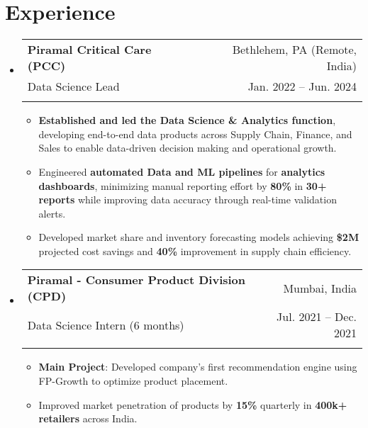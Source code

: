 \documentclass[letter paper,11pt]{article}
\makeatletter
\newcommand{\resumeItem}[1]{
\justifying
\vspace{-2.89pt}
  \item\small{
    {#1}
  }
}
\newcommand{\resumeSubheading}[5]{%
  \item
    \begin{tabular*}
    {1\textwidth}
    {l@{\extracolsep{\fill}}r}
      \textbf{#1} & \small#2 \\
      {\small#3} & {\small #4} \\
      {\small#5}
    \end{tabular*}%
  \vspace{-0.95cm}
}
\newcommand{\resumeSubHeadingListStart}{\begin{itemize}[leftmargin=0.0in, label={}]}
\newcommand{\resumeSubHeadingListEnd}{\end{itemize}}
\newcommand{\resumeItemListStart}{\begin{itemize}}
\newcommand{\resumeItemListEnd}{\end{itemize}}
\makeatother
\begin{document}
\section{Experience}
  \resumeSubHeadingListStart
    \resumeSubheading
    {Piramal Critical Care (PCC)}
    {Bethlehem, PA (Remote, India)}
    {Data Science Lead}
    {Jan. 2022 -- Jun. 2024}{}
    
    \resumeItemListStart
    \resumeItem{\textbf{Established and led the Data Science \& Analytics function}, developing end-to-end data products across Supply Chain, Finance, and Sales to enable data-driven decision making and operational growth.}
    \resumeItem{Engineered \textbf{automated Data and ML pipelines} for \textbf{analytics dashboards}, minimizing manual reporting effort by \textbf{80\%} in \textbf{30+ reports} while improving data accuracy through real-time validation alerts.}
    \resumeItem{Developed market share and inventory forecasting models achieving  \textbf{\$2M} projected cost savings and \textbf{40\%} improvement in supply chain efficiency.
    }
    
    \resumeItemListEnd

    \vspace{-10px}
    \resumeSubheading
    {\textbf{Piramal - Consumer Product Division (CPD)}}{Mumbai, India}
    {Data Science Intern (6 months)}{Jul. 2021 -- Dec. 2021}{}
    
    \resumeItemListStart
    \resumeItem{\textbf{Main Project}: Developed company's first recommendation engine using FP-Growth to optimize product placement.}
\resumeItem{Improved market penetration of products by \textbf{15\%} quarterly in \textbf{400k+ retailers} across India.}

    \resumeItemListEnd
\resumeSubHeadingListEnd



\end{document}
